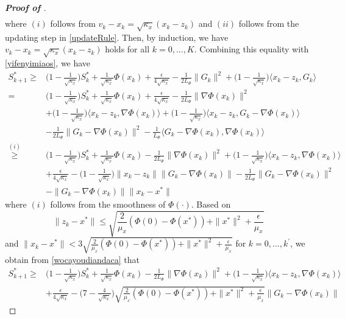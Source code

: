 \documentclass{osudissert96}
\begin{document}
\begin{proof}[{\bf Proof of }]
\begin{align*}
 \end{align*}
 where $(i)$ follows from $v_k-x_k = \sqrt{\kappa_x}(x_k-z_k)$ and $(ii)$ follows from the updating step in \cref{updateRule}. Then, by induction, we have $v_k-x_k = \sqrt{\kappa_x}(x_k-z_k)$ holds for all $k=0,...,K$. Combining this equality with \cref{yifenyimiaos}, we have
 \begin{align}\label{wocayoudiandaca}
 S_{k+1}^* \geq & \big(1-\frac{1}{\sqrt{\kappa_x}} \big) S_{k}^* +\frac{1}{\sqrt{\kappa_x}}\Phi(x_k) + \frac{\epsilon}{4\sqrt{\kappa_x}}- \frac{1}{2L_\Phi}\|G_k\|^2 +  \big(1-\frac{1}{\sqrt{\kappa_x}} \big)\langle x_k-z_k,G_k \rangle \nonumber
 \\=& \Big(1-\frac{1}{\sqrt{\kappa_x}} \Big) S_{k}^* +\frac{1}{\sqrt{\kappa_x}}\Phi(x_k) + \frac{\epsilon}{4\sqrt{\kappa_x}}- \frac{1}{2L_\Phi}\|\nabla\Phi(x_k)\|^2  \nonumber
 \\&  +\Big(1-\frac{1}{\sqrt{\kappa_x}} \Big)\langle x_k-z_k,\nabla \Phi(x_k) \rangle +  \Big(1-\frac{1}{\sqrt{\kappa_x}} \Big)\langle x_k-z_k,G_k-\nabla \Phi(x_k)\rangle \nonumber
 \\& - \frac{1}{2L_\Phi}\|G_k-\nabla\Phi(x_k)\|^2 - \frac{1}{L_\Phi}\langle G_k-\nabla \Phi(x_k), \nabla\Phi(x_k)\rangle \nonumber
\\\overset{(i)}\geq& \big(1-\frac{1}{\sqrt{\kappa_x}} \big) S_{k}^* +\frac{1}{\sqrt{\kappa_x}}\Phi(x_k) - \frac{1}{2L_\Phi}\|\nabla\Phi(x_k)\|^2 +\big(1-\frac{1}{\sqrt{\kappa_x}} \big)\langle x_k-z_k,\nabla \Phi(x_k) \rangle  \nonumber
 \\&+\frac{\epsilon}{4\sqrt{\kappa_x}} -  \Big(1-\frac{1}{\sqrt{\kappa_x}} \Big)\| x_k-z_k\|\|G_k-\nabla \Phi(x_k)\| - \frac{1}{2L_\Phi}\|G_k-\nabla\Phi(x_k)\|^2 \nonumber
 \\&-\| G_k-\nabla \Phi(x_k)\|\| x_k-x^*\|
 \end{align}
 where $(i)$ follows from the smoothness of $\Phi(\cdot)$. Based on $$\|z_k-x^*\|\leq\sqrt{\frac{2}{\mu_x}(\Phi(0) -\Phi(x^*))+ \|x^*\|^2+\frac{\epsilon}{\mu_x}}$$ and $\|x_k-x^*\|<3\sqrt{\frac{2}{\mu_x}(\Phi(0) -\Phi(x^*))+ \|x^*\|^2+\frac{\epsilon}{\mu_x}}$ for $k=0,...,k^\prime$, we obtain from \cref{wocayoudiandaca} that 
 \begin{align}\label{wocaolalascs}
 S_{k+1}^* \geq & \big(1-\frac{1}{\sqrt{\kappa_x}} \big) S_{k}^* +\frac{1}{\sqrt{\kappa_x}}\Phi(x_k) - \frac{1}{2L_\Phi}\|\nabla\Phi(x_k)\|^2 +\big(1-\frac{1}{\sqrt{\kappa_x}} \big)\langle x_k-z_k,\nabla \Phi(x_k) \rangle  \nonumber
 \\& + \frac{\epsilon}{4\sqrt{\kappa_x}}-  \Big(7-\frac{4}{\sqrt{\kappa_x}} \Big)\sqrt{\frac{2}{\mu_x}(\Phi(0) -\Phi(x^*))+ \|x^*\|^2+\frac{\epsilon}{\mu_x}}\|G_k-\nabla \Phi(x_k)\| \nonumber

\end{align}
\end{proof}
\end{document}
